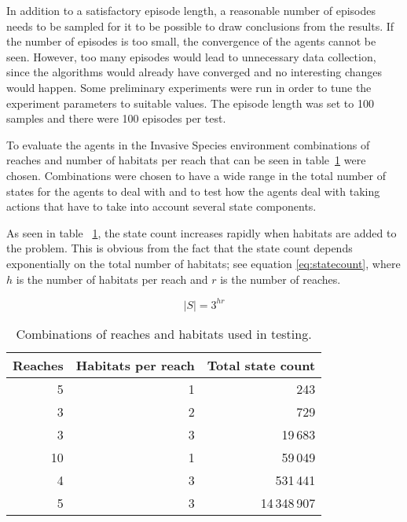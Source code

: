In addition to a satisfactory episode length, a reasonable number of episodes
needs to be sampled for it to be possible to draw conclusions from the results.
If the number of episodes is too small, the convergence of the agents cannot be
seen. However, too many episodes would lead to unnecessary data collection, since the algorithms would already have converged and no interesting changes
would happen. Some preliminary experiments were run in order to tune the
experiment parameters to suitable values. The episode length was set to 100
samples and there were 100 episodes per test.

To evaluate the agents in the Invasive Species environment combinations of
reaches and number of habitats per reach that can be seen in
table~\ref{tab:reaches_habitats} were chosen. Combinations were chosen to have
a wide range in the total number of states for the agents to deal with and to
test how the agents deal with taking actions that have to take into account
several state components. 

As seen in table ~\ref{tab:reaches_habitats}, the state count increases rapidly
when habitats are added to the problem. This is obvious from the fact that the
state count depends exponentially on the total number of habitats; see equation
\eqref{eq:statecount}, where $h$ is the number of habitats per reach and $r$ is
the number of reaches.

\begin{equation}
\label{eq:statecount}
 |S| = 3 ^ {hr}
\end{equation}

\begin{table}[H]
\centering
\caption{Combinations of reaches and habitats used in testing.}
\label{tab:reaches_habitats}
\begin{tabular}{rrr}
 \toprule
 Reaches & Habitats per reach & Total state count \\
 \midrule
 5  & 1 &          243 \\
 3  & 2 &          729 \\
 3  & 3 &      19\,683 \\
 10 & 1 &      59\,049 \\
 4  & 3 &     531\,441 \\
 5  & 3 & 14\,348\,907 \\
 \bottomrule
\end{tabular}
\end{table}
